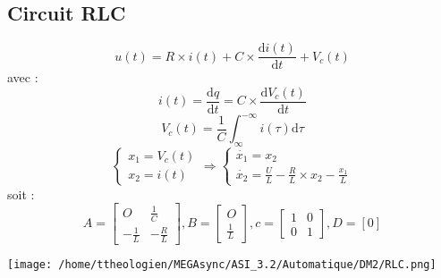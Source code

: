 \documentclass[a4paper,12pt]{article}
\begin{document}
    \subsection{Circuit RLC}
    \label{sub:Circuit RLC}
    \[u(t) = R \times i(t) + C \times \frac{\mathrm{d}i(t)}{\mathrm{d}t} + V_c(t)\]
    avec :
    \[i(t) = \frac{\mathrm{d}q}{\mathrm{d}t} = C \times \frac{\mathrm{d}V_c(t)}{\mathrm{d}t}\]
    \[V_c(t) = \frac{1}{C} \int_{\infty}^{-\infty}i(\tau)\mathrm{d}\tau\]
    \[\left\{
              \begin{array}{ll}
                x_1 = V_c(t)\\
                x_2 = i(t)
              \end{array}
      \right.
      \Rightarrow
      \left\{
              \begin{array}{ll}
                \dot{x_1} = x_2\\
                \dot{x_2} = \frac{U}{L} - \frac{R}{L} \times x_2 - \frac{x_1}{L}
              \end{array}
      \right.
      \]
    soit :
    \[ A = \left[
                  \begin{array}{cc}
                    O             & \frac{1}{C}\\
                    -\frac{1}{L}  & -\frac{R}{L}
                  \end{array}
            \right],
        B = \left[
                  \begin{array}{c}
                    O\\
                    \frac{1}{L}
                  \end{array}
            \right],
        c = \left[
                  \begin{array}{cc}
                    1 & 0\\
                    0 & 1
                  \end{array}
            \right],
        D = [0]
    \]

    \begin{center}
      \texttt{[image: /home/ttheologien/MEGAsync/ASI\_3.2/Automatique/DM2/RLC.png]}
    \end{center}

    \newpage
\end{document}
